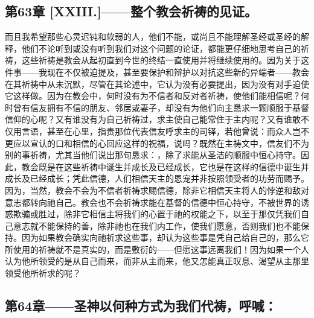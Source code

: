 
\subsection{第63章 [XXIII.]——整个教会祈祷的见证。}

而且我希望那些心灵迟钝和软弱的人，他们不能，或尚且不能理解圣经或圣经的解释，他们不论听到或没有听到我们对这个问题的论证，都能更仔细地思考自己的祈祷，这些祈祷是教会从起初直到今世的终结一直使用并将继续使用的。因为关于这件事——我现在不仅被迫提及，甚至要保护和辩护以对抗这些新的异端者——教会在其祈祷中从未沉默，尽管在其论述中，它认为没有必要提出，因为没有对手迫使它这样做。因为在教会中，何时没有为不信者和反对者祈祷，使他们能相信呢？何时曾有信友拥有不信的朋友、邻居或妻子，却没有为他们向主恳求一颗顺服于基督信仰的心呢？又有谁没有为自己祈祷过，求主使自己能常住于主内呢？又有谁敢不仅用言语，甚至在心里，指责那位代表信友呼求主的司铎，若他曾说：而众人岂不更应以宣认的口和相信的心回应这样的祝福，说吗？既然在主祷文中，信友们不为别的事祈祷，尤其当他们说出那句恳求：，除了求能从圣洁的顺服中恒心持守。因此，教会既是在这些祈祷中诞生并成长及已经成长，它也是在这样的信德中诞生并成长及已经成长；凭此信德，人们相信天主的恩宠并非按照领受者的功劳而赐予。因为，当然，教会不会为不信者祈祷求赐信德，除非它相信天主将人的悖逆和敌对意志都转向祂自己。教会也不会祈祷求能在基督的信德中恒心持守，不被世界的诱惑欺骗或胜过，除非它相信主将我们的心置于祂的权能之下，以至于那仅凭我们自己意志就不能保持的善，除非祂也在我们内工作，使我们愿意，否则我们也不能保持。因为如果教会确实向祂祈求这些事，却认为这些事是凭自己给自己的，那么它所使用的祈祷就不是真实的，而是敷衍的——但愿这事远离我们！因为如果一个人认为他所领受的是从自己而来，而非从主而来，他又怎能真正叹息、渴望从主那里领受他所祈求的呢？\par


\subsection{第64章——圣神以何种方式为我们代祷，呼喊：}

